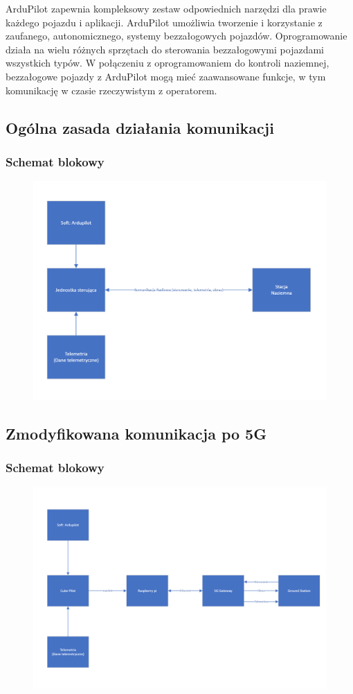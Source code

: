 \documentclass[../Research.tex]{subfiles}
\begin{document}
ArduPilot zapewnia kompleksowy zestaw odpowiednich narzędzi dla prawie każdego pojazdu i aplikacji. ArduPilot umożliwia tworzenie i korzystanie z zaufanego, autonomicznego, systemy bezzałogowych pojazdów.
Oprogramowanie działa na wielu różnych sprzętach do sterowania bezzałogowymi pojazdami wszystkich typów. W połączeniu z oprogramowaniem do kontroli naziemnej, bezzałogowe pojazdy z ArduPilot mogą mieć zaawansowane funkcje, w tym komunikację w czasie rzeczywistym z operatorem.
\subsection{Ogólna zasada działania komunikacji}
\subsubsection{Schemat blokowy}
\begin{figure}[H]
    \centering
    \includegraphics[width=0.7 \textwidth]{ogolna.png}
    \label{fig:obraz1}
\end{figure}

\subsection{Zmodyfikowana komunikacja po 5G}
\subsubsection{Schemat blokowy}
\begin{figure}[H]
    \centering
    \includegraphics[width=0.7 \textwidth]{po.png}
    \label{fig:obraz2}
\end{figure}
\end{document}
